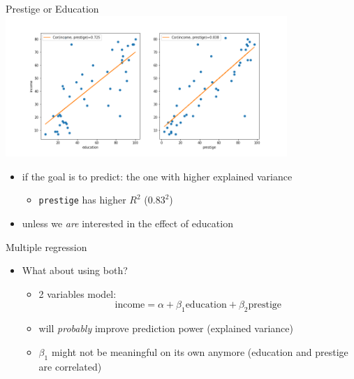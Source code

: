 \documentclass[
  ignorenonframetext,
  aspectratio=169,
]{beamer}
\providecommand{\tightlist}{%
  \setlength{\itemsep}{0pt}\setlength{\parskip}{0pt}}\usepackage{longtable,booktabs,array}
\begin{document}
\begin{frame}[fragile]
\begin{block}{Prestige or Education}
\protect\hypertarget{prestige-or-education}{}
\includegraphics[width=0.8\textwidth,height=\textheight]{./graphs/prestige_or_education.png}

\begin{itemize}
\tightlist
\item
  if the goal is to predict: the one with higher explained variance

  \begin{itemize}
  \tightlist
  \item
    \texttt{prestige} has higher \(R^2\) (\(0.83^2\))
  \end{itemize}
\item
  unless we \emph{are} interested in the effect of education
\end{itemize}
\end{block}
\end{frame}

\begin{frame}
\begin{block}{Multiple regression}
\protect\hypertarget{multiple-regression}{}
\begin{itemize}
\tightlist
\item
  What about using both?

  \begin{itemize}
  \tightlist
  \item
    2 variables model:
    \[\text{income} = \alpha + \beta_1 \text{education} + \beta_2 \text{prestige}\]
  \item
    will \emph{probably} improve prediction power (explained variance)
  \item
    \(\beta_1\) might not be meaningful on its own anymore (education
    and prestige are correlated)
  \end{itemize}
\end{itemize}
\end{block}
\end{frame}
\end{document}
